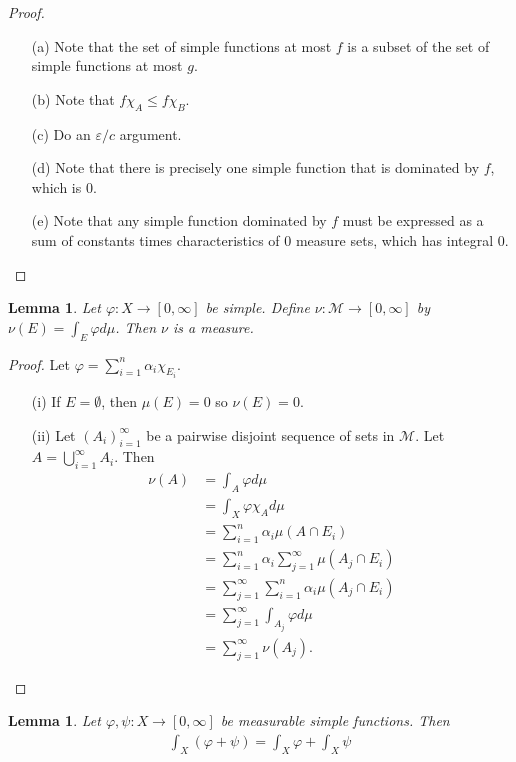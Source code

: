 \documentclass[11pt]{amsart}
\newtheorem{lemma}[theorem]{Lemma}
\theoremstyle{definition}
\numberwithin{equation}{section}
\begin{document}
\begin{proof}
    \begin{enumerate}
        \item [(a)] Note that the set of simple functions at most $f$ is a subset of the set of simple functions at most $g$.
        \item [(b)] Note that $f\chi_A\le f\chi_B$.
        \item [(c)] Do an $\varepsilon/c$ argument.
        \item [(d)] Note that there is precisely one simple function that is dominated by $f$, which is 0.
        \item [(e)] Note that any simple function dominated by $f$ must be expressed as a sum of constants times characteristics of 0 measure sets, which has integral 0.
    \end{enumerate}
\end{proof}
\begin{lemma}
    Let $\varphi:X\to[0,\infty]$ be simple. Define $\nu:\mathcal M\to[0,\infty]$ by $\nu(E)=\int_E\varphi d\mu$. Then $\nu$ is a measure.
\end{lemma}
\begin{proof}
    Let $\varphi=\sum_{i=1}^n\alpha_i\chi_{E_i}$. 
    \begin{enumerate}
        \item [(i)] If $E=\emptyset$, then $\mu(E)=0$ so $\nu(E)=0$.
        \item [(ii)] Let $(A_i)_{i=1}^\infty$ be a pairwise disjoint sequence of sets in $\mathcal M$. Let $A=\bigcup_{i=1}^\infty A_i$. Then
        \begin{align*}
            \nu(A)&=\int_A\varphi d\mu\\
            &=\int_X\varphi\chi_Ad\mu\\
            &=\sum_{i=1}^n\alpha_i\mu(A\cap E_i)\\
            &=\sum_{i=1}^n\alpha_i\sum_{j=1}^\infty\mu(A_j\cap E_i)\\
            &=\sum_{j=1}^\infty\sum_{i=1}^n\alpha_i\mu(A_j\cap E_i)\\
            &=\sum_{j=1}^\infty\int_{A_j}\varphi d\mu\\
            &=\sum_{j=1}^\infty\nu(A_j).
        \end{align*}
    \end{enumerate}
\end{proof}
\begin{lemma}
    Let $\varphi,\psi:X\to[0,\infty]$ be measurable simple functions. Then
    \begin{align*}
        \int_X(\varphi+\psi)=\int_X\varphi+\int_X\psi
    \end{align*}
\end{lemma}
\end{document}
